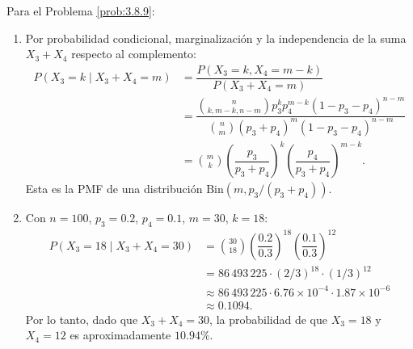 \begin{solucion}
	\label{sol:3.8.9}
	Para el Problema \ref{prob:3.8.9}:
	\begin{enumerate}
		\item Por probabilidad condicional, marginalización y la independencia de la suma $X_{3} + X_{4}$ respecto al complemento:
		\begin{align*}
			P(X_{3} = k \mid X_{3} + X_{4} = m) &= \dfrac{P(X_{3} = k, X_{4} = m-k)}{P(X_{3} + X_{4} = m)} \\
			&= \dfrac{\binom{n}{k, m-k, n-m} p_{3}^{k} p_{4}^{m-k} (1 - p_{3} - p_{4})^{n-m}}{\binom{n}{m} (p_{3} + p_{4})^{m} (1 - p_{3} - p_{4})^{n-m}} \\
			&= \binom{m}{k} \left(\dfrac{p_{3}}{p_{3} + p_{4}}\right)^{k} \left(\dfrac{p_{4}}{p_{3} + p_{4}}\right)^{m-k}.
		\end{align*}
		Esta es la PMF de una distribución $\text{Bin}(m, p_{3}/(p_{3}+p_{4}))$.
		\item Con $n = 100$, $p_{3} = 0.2$, $p_{4} = 0.1$, $m = 30$, $k = 18$:
		\begin{align*}
			P(X_{3} = 18 \mid X_{3} + X_{4} = 30) &= \binom{30}{18} \left(\dfrac{0.2}{0.3}\right)^{18} \left(\dfrac{0.1}{0.3}\right)^{12} \\
			&= 86\,493\,225 \cdot (2/3)^{18} \cdot (1/3)^{12} \\
			&\approx 86\,493\,225 \cdot 6.76 \times 10^{-4} \cdot 1.87 \times 10^{-6} \\
			&\approx 0.1094.
		\end{align*}
		Por lo tanto, dado que $X_{3} + X_{4} = 30$, la probabilidad de que $X_{3} = 18$ y $X_{4} = 12$ es aproximadamente $10.94\%$.
	\end{enumerate}
\end{solucion}

